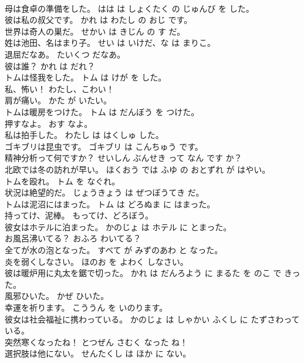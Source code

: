 \documentclass[8pt]{extreport}
\begin{document}
\begin{CJK}{UTF8}{min}
\\	母は食卓の準備をした。	はは は しょくたく の じゅんび を した。	
\\	彼は私の叔父です。	かれ は わたし の おじ です。	
\\	世界は奇人の巣だ。	せかい は きじん の す だ。	
\\	姓は池田、名はまり子。	せい は いけだ、な は まりこ。	
\\	退屈だなあ。	たいくつ だなあ。	
\\	彼は誰？	かれ は だれ？	
\\	トムは怪我をした。	トム は けが を した。	
\\	私、怖い！	わたし、こわい！	
\\	肩が痛い。	かた が いたい。	
\\	トムは暖房をつけた。	トム は だんぼう を つけた。	
\\	押すなよ。	おす なよ。	
\\	私は拍手した。	わたし は はくしゅ した。	
\\	ゴキブリは昆虫です。	ゴキブリ は こんちゅう です。	
\\	精神分析って何ですか？	せいしん ぶんせき って なん です か？	
\\	北欧では冬の訪れが早い。	ほくおう では ふゆ の おとずれ が はやい。	
\\	トムを殴れ。	トム を なぐれ。	
\\	状況は絶望的だ。	じょうきょう は ぜつぼうてき だ。	
\\	トムは泥沼にはまった。	トム は どろぬま に はまった。	
\\	持ってけ、泥棒。	もってけ、どろぼう。	
\\	彼女はホテルに泊まった。	かのじょ は ホテル に とまった。	
\\	お風呂沸いてる？	おふろ わいてる？	
\\	全てが水の泡となった。	すべて が みずのあわ と なった。	
\\	炎を弱くしなさい。	ほのお を よわく しなさい。	
\\	彼は暖炉用に丸太を鋸で切った。	かれ は だんろよう に まるた を のこ で きった。	
\\	風邪ひいた。	かぜ ひいた。	
\\	幸運を祈ります。	こううん を いのります。	
\\	彼女は社会福祉に携わっている。	かのじょ は しゃかい ふくし に たずさわっている。	
\\	突然寒くなったね！	とつぜん さむく なった ね！	
\\	選択肢は他にない。	せんたくし は ほか に ない。	

\end{CJK}
\end{document}
